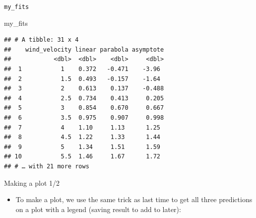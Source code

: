 \documentclass[
  ignorenonframetext,
]{beamer}
\newenvironment{Shaded}{\begin{snugshade}}{\end{snugshade}}
\newcommand{\DataTypeTok}[1]{\textcolor[rgb]{0.13,0.29,0.53}{#1}}
\newcommand{\KeywordTok}[1]{\textcolor[rgb]{0.13,0.29,0.53}{\textbf{#1}}}
\newcommand{\NormalTok}[1]{#1}
\newcommand{\OperatorTok}[1]{\textcolor[rgb]{0.81,0.36,0.00}{\textbf{#1}}}
\newcommand{\StringTok}[1]{\textcolor[rgb]{0.31,0.60,0.02}{#1}}
\providecommand{\tightlist}{%
  \setlength{\itemsep}{0pt}\setlength{\parskip}{0pt}}
\begin{document}
\begin{frame}[fragile]{\texttt{my\_fits}}
\protect\hypertarget{my_fits}{}

\begin{Shaded}
\begin{Highlighting}[]
\NormalTok{my_fits}
\end{Highlighting}
\end{Shaded}

\begin{verbatim}
## # A tibble: 31 x 4
##    wind_velocity linear parabola asymptote
##            <dbl>  <dbl>    <dbl>     <dbl>
##  1           1    0.372   -0.471    -3.96 
##  2           1.5  0.493   -0.157    -1.64 
##  3           2    0.613    0.137    -0.488
##  4           2.5  0.734    0.413     0.205
##  5           3    0.854    0.670     0.667
##  6           3.5  0.975    0.907     0.998
##  7           4    1.10     1.13      1.25 
##  8           4.5  1.22     1.33      1.44 
##  9           5    1.34     1.51      1.59 
## 10           5.5  1.46     1.67      1.72 
## # … with 21 more rows
\end{verbatim}

\end{frame}

\begin{frame}[fragile]{Making a plot 1/2}
\protect\hypertarget{making-a-plot-12}{}

\begin{itemize}
\tightlist
\item
  To make a plot, we use the same trick as last time to get all three
  predictions on a plot with a legend (saving result to add to later):
\end{itemize}

\begin{Shaded}
\end{Shaded}

\end{frame}
\end{document}
